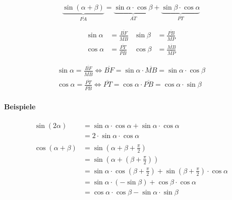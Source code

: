 \[
	\underbrace{\sin(\alpha + \beta)}_{\overline{PA}} =
	\underbrace{\sin \alpha \cdot \cos \beta}_{\overline{AT}} +
	\underbrace{\sin \beta \cdot \cos \alpha}_{\overline{PT}}
\]

\begin{align*}
	\sin \alpha & = \frac{\overline{BF}}{\overline{MB}}
	            & \sin \beta                            & = \frac{\overline{PB}}{\overline{MP}} \\
	\cos \alpha & = \frac{\overline{PT}}{\overline{PB}}
	            & \cos \beta                            & = \frac{\overline{MB}}{\overline{MP}}
\end{align*}

\begin{align*}
	\sin \alpha = \frac{\overline{BF}}{\overline{MB}}
	\Leftrightarrow \overline{BF} = \sin \alpha \cdot \overline{MB}
	= \sin \alpha \cdot \cos \beta \\
	\cos \alpha = \frac{\overline{PT}}{\overline{PB}}
	\Leftrightarrow \overline{PT} = \cos \alpha \cdot \overline{PB}
	= \cos \alpha \cdot \sin \beta
\end{align*}

\paragraph{Beispiele}

\begin{align*}
	\sin(2 \alpha)
	 & = \sin\alpha \cdot \cos\alpha + \sin\alpha \cdot \cos\alpha    \\
	 & = 2 \cdot \sin\alpha \cdot \cos\alpha                          \\
	\\
	\cos(\alpha + \beta)
	 & = \sin\left(\alpha + \beta + \frac{\pi}{2}\right)              \\
	 & = \sin\left(\alpha + \left(\beta + \frac{\pi}{2}\right)\right) \\
	 & = \sin\alpha \cdot \cos\left( \beta + \frac{\pi}{2} \right)
	+ \sin\left( \beta + \frac{\pi}{2} \right) \cdot \cos\alpha       \\
	 & = \sin\alpha \cdot (-\sin\beta) + \cos\beta \cdot \cos\alpha   \\
	 & = \cos\alpha \cdot \cos\beta - \sin\alpha \cdot \sin\beta
\end{align*}
